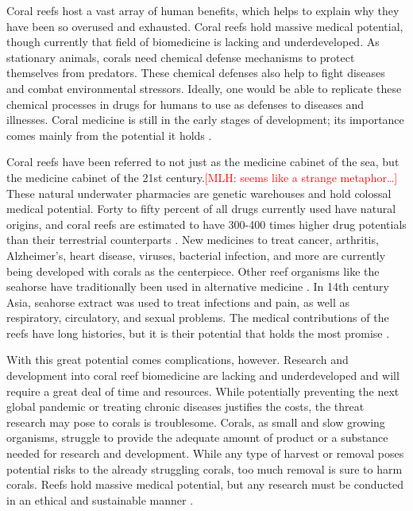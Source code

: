 \documentclass{book}\usepackage{knitr}
\newcommand{\red}[1]{\textcolor{red}{[MLH: #1]}}
\begin{document}
\begin{knitrout}
\begin{kframe}
{Coral reefs host a vast array of human benefits, which helps to explain why they have been so overused and exhausted. Coral reefs hold massive medical potential, though currently that field of biomedicine is lacking and underdeveloped. As stationary animals, corals need chemical defense mechanisms to protect themselves from predators. These chemical defenses also help to fight diseases and combat environmental stressors. Ideally, one would be able to replicate these chemical processes in drugs for humans to use as defenses to diseases and illnesses. Coral medicine is still in the early stages of development; its importance comes mainly from the potential it holds \citep{AndrewWBruckner_1970}.

Coral reefs have been referred to not just as the medicine cabinet of the sea, but the medicine cabinet of the 21st century.\red{seems like a strange metaphor\ldots} These natural underwater pharmacies are genetic warehouses and hold colossal medical potential. Forty to fifty percent of all drugs currently used have natural origins, and coral reefs are estimated to have 300-400 times higher drug potentials than their terrestrial counterparts \citep{AndrewWBruckner_1970}. New medicines to treat cancer, arthritis, Alzheimer’s, heart disease, viruses, bacterial infection, and more are currently being developed with corals as the centerpiece. Other reef organisms like the seahorse have traditionally been used in alternative medicine \citep{coralreefalliance_2021}. In 14th century Asia, seahorse extract was used to treat infections and pain, as well as respiratory, circulatory, and sexual problems. The medical contributions of the reefs have long histories, but it is their potential that holds the most promise \citep{AndrewWBruckner_1970}.

With this great potential comes complications, however. Research and development into coral reef biomedicine are lacking and underdeveloped and will require a great deal of time and resources. While potentially preventing the next global pandemic or treating chronic diseases justifies the costs, the threat research may pose to corals is troublesome. Corals, as small and slow growing organisms, struggle to provide the adequate amount of product or a substance needed for research and development. While any type of harvest or removal poses potential risks to the already struggling corals, too much removal is sure to harm corals. Reefs hold massive medical potential, but any research must be conducted in an ethical and sustainable manner \citep{AndrewWBruckner_1970}.

}
\end{kframe}
\end{knitrout}
\end{document}
